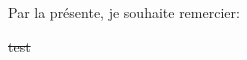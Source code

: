 \begin{ThesisAcknowledgments}

	Par la présente, je souhaite remercier:
	\begin{todolist}
		\item \st{test}
	\end{todolist}

\end{ThesisAcknowledgments}